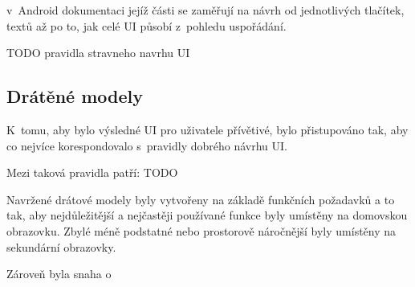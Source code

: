 v~Android dokumentaci jejíž části se zaměřují na návrh od jednotlivých tlačítek, textů až po to, jak celé UI působí z~pohledu
uspořádání.



TODO pravidla stravneho navrhu UI

\subsection{Drátěné modely} \label{navrhWireframes}
K~tomu, aby bylo výsledné UI pro uživatele přívětivé, bylo přistupováno tak, aby co nejvíce korespondovalo s~pravidly dobrého návrhu UI.

Mezi taková pravidla patří:
TODO

Navržené drátové modely byly vytvořeny na základě funkčních požadavků a to tak, aby nejdůležitější a nejčastěji používané funkce byly 
umístěny na domovskou obrazovku. Zbylé méně podstatné nebo prostorově náročnější byly umístěny na sekundární obrazovky.

Zároveň byla snaha o 

